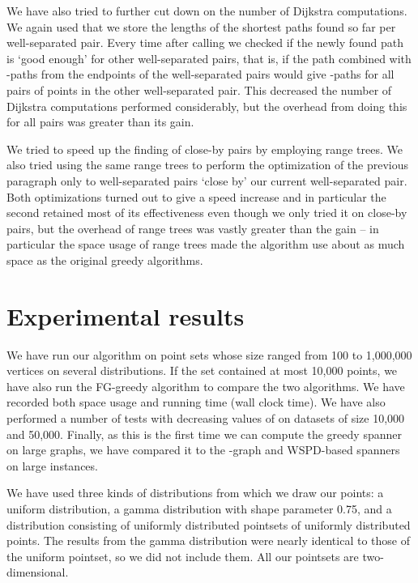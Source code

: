 \documentclass[runningheads,envcountsame,oribibl,orivec]{llncs}
\begin{document}
We have also tried to further cut down on the number of Dijkstra computations. We again used that we store the lengths of the shortest paths found so far per well-separated pair. Every time after calling  we checked if the newly found path is `good enough' for other well-separated pairs, that is, if the path combined with -paths from the endpoints of the well-separated pairs would give -paths for all pairs of points in the other well-separated pair. This decreased the number of Dijkstra computations performed considerably, but the overhead from doing this for all pairs was greater than its gain.

We tried to speed up the finding of close-by pairs by employing range trees. We also tried using the same range trees to perform the optimization of the previous paragraph only to well-separated pairs `close by' our current well-separated pair. Both optimizations turned out to give a speed increase and in particular the second retained most of its effectiveness even though we only tried it on close-by pairs, but the overhead of range trees was vastly greater than the gain -- in particular the space usage of range trees made the algorithm use about as much space as the original greedy algorithms.

\section{Experimental results} \label{section:results}

We have run our algorithm on point sets whose size ranged from 100 to 1,000,000 vertices on several distributions. If the set contained at most 10,000 points, we have also run the FG-greedy algorithm to compare the two algorithms. We have recorded both space usage and running time (wall clock time). We have also performed a number of tests with decreasing values of  on datasets of size 10,000 and 50,000. Finally, as this is the first time we can compute the greedy spanner on large graphs, we have compared it to the -graph and WSPD-based spanners on large instances.

We have used three kinds of distributions from which we draw our points: a uniform distribution, a gamma distribution with shape parameter 0.75, and a distribution consisting of  uniformly distributed pointsets of  uniformly distributed points. The results from the gamma distribution were nearly identical to those of the uniform pointset, so we did not include them. All our pointsets are two-dimensional.
\end{document}
